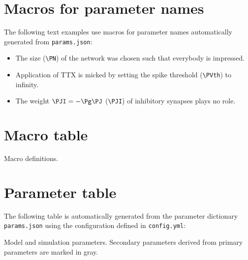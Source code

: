 \documentclass[10pt,a4paper,american]{article}
\begin{document}
\section{Macros for parameter names}


The following text examples use macros for parameter names automatically generated from \texttt{params.json}:
\begin{itemize}
\item The size \PN (\verb+\PN+) of the network was chosen such that everybody is impressed.
\item Application of TTX is micked by setting the spike threshold \PVth (\verb+\PVth+) to infinity.
\item The weight $\PJI=-\Pg\PJ$ (\verb+\PJI+) of inhibitory synapses plays no role.
\end{itemize}

\section{Macro table}
\begin{table}[ht!]
\begin{center}
  \parbox{0.8\linewidth}{       %
    \small%
    \centering%
    \renewcommand{\arraystretch}{1.2}%
    \noindent%
    \caption{Macro definitions.}
    \label{tab:macros_table}
  }
\end{center}
\end{table}

\section{Parameter table}
The following table is automatically generated from the parameter dictionary \texttt{params.json} using the configuration defined in \texttt{config.yml}: 
\begin{table}[ht!]
\begin{center}
  \parbox{0.8\linewidth}{       %
    \small%
    \centering%
    \renewcommand{\arraystretch}{1.2}%
    \noindent%
    \caption{Model and simulation parameters. Secondary parameters derived from primary parameters are marked in gray.}
    \label{tab:parameter_table}
  }
\end{center}
\end{table}
\end{document}
